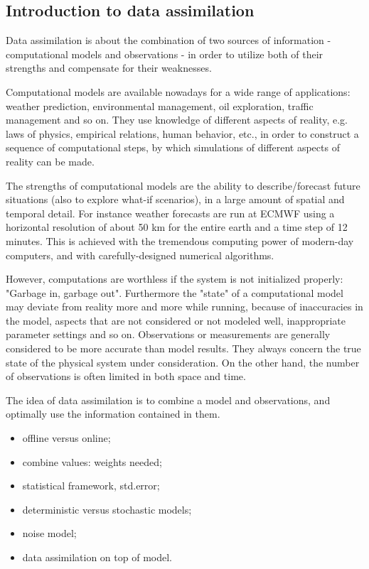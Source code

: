 \subsection{Introduction to data assimilation}
Data assimilation is about the combination of two sources of information - computational models and observations - in order to utilize both of their strengths and compensate for their weaknesses.

Computational models are available nowadays for a wide range of applications: weather prediction, environmental management, oil exploration, traffic management and so on. They use knowledge of different aspects of reality, e.g. laws of physics, empirical relations, human behavior, etc., in order to construct a sequence of computational steps, by which simulations of different aspects of reality can be made.

The strengths of computational models are the ability to describe/forecast future situations (also to explore what-if scenarios), in a large amount of spatial and temporal detail. For instance weather forecasts are run at ECMWF using a horizontal resolution of about 50 km for the entire earth and a time step of 12 minutes. This is achieved with the tremendous computing power of modern-day computers, and with carefully-designed numerical algorithms.

However, computations are worthless if the system is not initialized properly: "Garbage in, garbage out". Furthermore the "state" of a computational model may deviate from reality more and more while running, because of inaccuracies in the model, aspects that are not considered or not modeled well, inappropriate parameter settings and so on. Observations or measurements are generally considered to be more accurate than model results. They always concern the true state of the physical system under consideration. On the other hand, the number of observations is often limited in both space and time.

The idea of data assimilation is to combine a model and observations, and optimally use the information contained in them.

\begin{itemize}
    \item offline versus online;
    \item combine values: weights needed;
    \item statistical framework, std.error;
    \item deterministic versus stochastic models;
    \item noise model;
    \item data assimilation on top of model.
\end{itemize}

